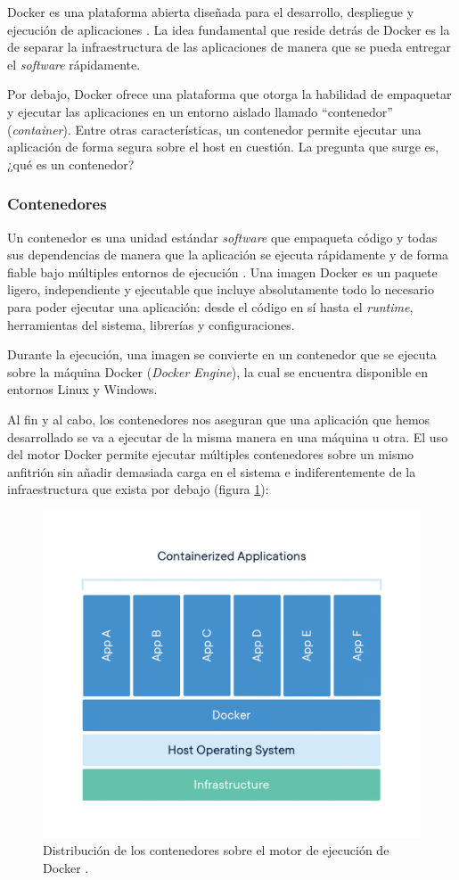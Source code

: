 Docker es una plataforma abierta diseñada para el desarrollo, despliegue y ejecución
de aplicaciones \cite{DockerOverview2021}. La idea fundamental que reside detrás de
Docker es la de separar la infraestructura de las aplicaciones de manera que se pueda
entregar el \textit{software} rápidamente.

Por debajo, Docker ofrece una plataforma que otorga la habilidad de empaquetar y
ejecutar las aplicaciones en un entorno aislado llamado ``contenedor'' (\textit{container}).
Entre otras características, un contenedor permite ejecutar una aplicación de forma
segura sobre el host en cuestión. La pregunta que surge es, ¿qué es un contenedor?

\subsubsection*{Contenedores}
Un contenedor es una unidad estándar \textit{software} que empaqueta código y todas
sus dependencias de manera que la aplicación se ejecuta rápidamente y de forma fiable
bajo múltiples entornos de ejecución \cite{WhatContainerApp}. Una imagen Docker
es un paquete ligero, independiente y ejecutable que incluye absolutamente todo
lo necesario para poder ejecutar una aplicación: desde el código en sí hasta el
\textit{runtime}, herramientas del sistema, librerías y configuraciones.

Durante la ejecución, una imagen se convierte en un contenedor que se ejecuta sobre
la máquina Docker (\textit{Docker Engine}), la cual se encuentra disponible en 
entornos Linux y Windows.

Al fin y al cabo, los contenedores nos aseguran que una aplicación que hemos 
desarrollado se va a ejecutar de la misma manera en una máquina u otra. El uso del
motor Docker permite ejecutar múltiples contenedores sobre un mismo anfitrión
sin añadir demasiada carga en el sistema e indiferentemente de la infraestructura
que exista por debajo (figura \ref{fig:docker-containers-rt}):

\begin{figure}[H]
    \centering
    \includegraphics[width=.7\linewidth]{pictures/container-what-is-container.png}
    \caption{Distribución de los contenedores sobre el motor de ejecución de Docker \cite{WhatContainerApp}.}
    \label{fig:docker-containers-rt}
\end{figure}

